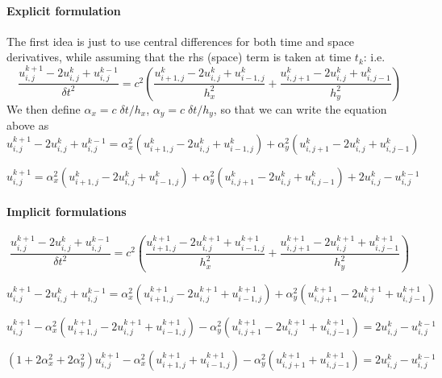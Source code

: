 \paragraph{Explicit formulation}

The first idea is just to use central differences for both time and space derivatives,
while assuming that the rhs (space) term is taken at time $t_k$:
i.e.
\[
\frac{ u_{i,j}^{k+1} -2u_{i,j}^{k} +u_{i,j}^{k-1}  }{\delta\! t^2} = 
c^2
\left(
\frac{ u_{i+1,j}^k -2u_{i,j}^k +u_{i-1,j}^k  }{h_x^2} 
+
\frac{ u_{i,j+1}^k -2u_{i,j}^k +u_{i,j-1}^k  }{h_y^2} 
\right)
\]
We then define $\alpha_x = c\; \delta\! t / h_x$,
$\alpha_y = c\; \delta\! t / h_y$, so that we can write the equation above as
\begin{equation}
u_{i,j}^{k+1} -2u_{i,j}^{k} +u_{i,j}^{k-1}  
= 
\alpha_x^2 (u_{i+1,j}^k -2u_{i,j}^k +u_{i-1,j}^k )
+
\alpha_y^2 (u_{i,j+1}^k -2u_{i,j}^k +u_{i,j-1}^k )
\label{eq:fdmwave1}
\end{equation}

\begin{mdframed}[backgroundcolor=blue!5]
\[
u_{i,j}^{k+1}
= \alpha_x^2 (u_{i+1,j}^k -2u_{i,j}^k +u_{i-1,j}^k )
+
\alpha_y^2 (u_{i,j+1}^k -2u_{i,j}^k +u_{i,j-1}^k )
+2u_{i,j}^{k} -u_{i,j}^{k-1}
\]
\end{mdframed}



\paragraph{Implicit formulations}

\[
\frac{ u_{i,j}^{k+1} -2u_{i,j}^{k} +u_{i,j}^{k-1}  }{\delta\! t^2} = 
c^2
\left(
\frac{ u_{i+1,j}^{k+1} -2u_{i,j}^{k+1} +u_{i-1,j}^{k+1}  }{h_x^2} 
+
\frac{ u_{i,j+1}^{k+1} -2u_{i,j}^{k+1} +u_{i,j-1}^{k+1}  }{h_y^2} 
\right)
\]

\[
u_{i,j}^{k+1} -2u_{i,j}^{k} +u_{i,j}^{k-1}  
=
\alpha_x^2 (u_{i+1,j}^{k+1} -2u_{i,j}^{k+1} +u_{i-1,j}^{k+1} )
+
\alpha_y^2 (u_{i,j+1}^{k+1} -2u_{i,j}^{k+1} +u_{i,j-1}^{k+1} )
\]

\[
u_{i,j}^{k+1}
-
\alpha_x^2 (u_{i+1,j}^{k+1} -2u_{i,j}^{k+1} +u_{i-1,j}^{k+1} )
-
\alpha_y^2 (u_{i,j+1}^{k+1} -2u_{i,j}^{k+1} +u_{i,j-1}^{k+1} )
=
2u_{i,j}^{k} -u_{i,j}^{k-1} 
\]

\begin{mdframed}[backgroundcolor=blue!5]
\[
(1+2\alpha_x^2+2\alpha_y^2)u_{i,j}^{k+1}
-
\alpha_x^2 (u_{i+1,j}^{k+1}  +u_{i-1,j}^{k+1} )
-
\alpha_y^2 (u_{i,j+1}^{k+1}  +u_{i,j-1}^{k+1} )
=
2u_{i,j}^{k} -u_{i,j}^{k-1} 
\]
\end{mdframed}






